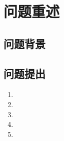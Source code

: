 \section{问题重述}
\subsection{问题背景}



\subsection{问题提出}
\begin{enumerate}
	\item 
	\item 
	\item 
	\item 
	\item
\end{enumerate}